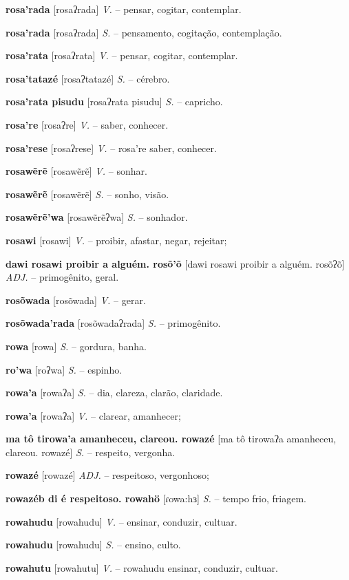\textbf{rosa'rada} [rosaʔrada] \textit{V.} -- pensar, cogitar, contemplar.

\textbf{rosa'rada} [rosaʔrada] \textit{S.} -- pensamento, cogitação, contemplação.

\textbf{rosa'rata} [rosaʔrata] \textit{V.} -- pensar, cogitar, contemplar.

\textbf{rosa'tatazé} [rosaʔtatazé] \textit{S.} -- cérebro.

\textbf{rosa'rata pisudu} [rosaʔrata pisudu] \textit{S.} -- capricho.

\textbf{rosa're} [rosaʔre] \textit{V.} -- saber, conhecer.

\textbf{rosa'rese} [rosaʔrese] \textit{V.} -- rosa're saber, conhecer.

\textbf{rosawẽrẽ} [rosawẽrẽ] \textit{V.} -- sonhar.

\textbf{rosawẽrẽ} [rosawẽrẽ] \textit{S.} -- sonho, visão.

\textbf{rosawẽrẽ'wa} [rosawẽrẽʔwa] \textit{S.} -- sonhador.

\textbf{rosawi} [rosawi] \textit{V.} -- proibir, afastar, negar, rejeitar;

\textbf{dawi rosawi proibir a alguém. rosõ'õ} [dawi rosawi proibir a alguém. rosõʔõ] \textit{ADJ.} -- primogênito, geral.

\textbf{rosõwada} [rosõwada] \textit{V.} -- gerar.

\textbf{rosõwada'rada} [rosõwadaʔrada] \textit{S.} -- primogênito.

\textbf{rowa} [rowa] \textit{S.} -- gordura, banha.

\textbf{ro'wa} [roʔwa] \textit{S.} -- espinho.

\textbf{rowa'a} [rowaʔa] \textit{S.} -- dia, clareza, clarão, claridade.

\textbf{rowa'a} [rowaʔa] \textit{V.} -- clarear, amanhecer;

\textbf{ma tô tirowa'a amanheceu, clareou. rowazé} [ma tô tirowaʔa amanheceu, clareou. rowazé] \textit{S.} -- respeito, vergonha.

\textbf{rowazé} [rowazé] \textit{ADJ.} -- respeitoso, vergonhoso;

\textbf{rowazéb di é respeitoso. rowahö} [ɾowa:hɜ] \textit{S.} -- tempo frio, friagem.

\textbf{rowahudu} [rowahudu] \textit{V.} -- ensinar, conduzir, cultuar.

\textbf{rowahudu} [rowahudu] \textit{S.} -- ensino, culto.

\textbf{rowahutu} [rowahutu] \textit{V.} -- rowahudu ensinar, conduzir, cultuar.

